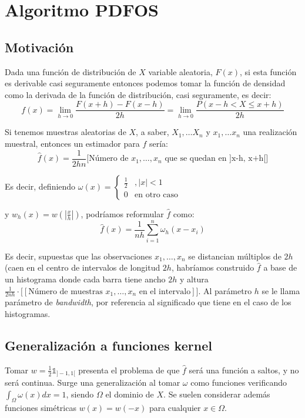 \section{Algoritmo PDFOS}

\subsection{Motivación}
Dada una función de distribución de $X$ variable aleatoria, $F(x)$, si esta función es derivable casi seguramente entonces
podemos tomar la función de densidad como la derivada de la función de distribución, casi seguramente, es decir:
\[f(x) = \lim_{h\rightarrow 0} \frac{F(x+h) - F(x-h)}{2h} = \lim_{h\rightarrow 0} \frac{P(x-h < X \le x+h)}{2h}\]

Si tenemos muestras aleatorias de $X$, a saber, $X_1, \ldots X_n$ y $x_1, \ldots x_n$ una realización muestral, entonces un 
estimador para $f$ sería:
\[\widehat{f}(x) = \frac{1}{2hn} \bigg[\textrm{Número de } x_1, \ldots, x_n \textrm{ que se quedan en ]x-h, x+h[}\bigg]\]

Es decir, definiendo $\omega(x) = \left\{\begin{array}{ll} 
                                \frac{1}{2} &, |x| < 1\\
                                0 & \textrm{en otro caso}
                                \end{array}\right.$
                                
                                
y $w_h(x) = w\left(\left|\frac{x}{h}\right|\right)$, podríamos reformular $\widehat{f}$ como:
\[\widehat{f}(x) = \frac{1}{nh} \sum_{i=1}^n \omega_h(x-x_i)\]

Es decir, supuestas que las observaciones $x_1, \ldots, x_n$ se distancian múltiplos de $2h$ (caen en el centro de intervalos
de longitud $2h$, habríamos construido $\widehat{f}$ a base de un histograma donde cada barra tiene ancho $2h$ y altura 
$\frac{1}{2nh} \cdot \bigg[[\textrm{Número de muestras } x_1, \ldots, x_n \textrm{ en el intervalo}]\bigg]$. Al parámetro $h$
se le llama parámetro de \textit{bandwidth}, por referencia al significado que tiene en el caso de los histogramas.

\subsection{Generalización a funciones kernel}
Tomar $w = \frac{1}{2} \mathds{1}_{]-1,1[}$ presenta el problema de que $\widehat{f}$ será una función a saltos, y no
será continua. Surge una generalización al tomar $\omega$ como funciones verificando $\int_{\Omega} \omega(x) dx = 1$, 
siendo $\Omega$ el dominio de $X$. Se suelen considerar además funciones simétricas $w(x) = w(-x)$ para cualquier 
$x\in \Omega$.

